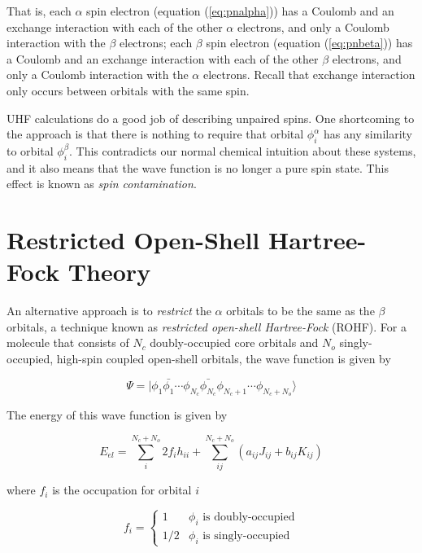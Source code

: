 \noindent That is, each $\alpha$ spin electron (equation
(\ref{eq:pnalpha})) has a Coulomb and an exchange interaction with
each of the other $\alpha$ electrons, and only a Coulomb
interaction with the $\beta$ electrons; each $\beta$ spin electron
(equation (\ref{eq:pnbeta})) has a Coulomb and an exchange interaction
with each of the other $\beta$ electrons, and only a Coulomb
interaction with the $\alpha$ electrons. Recall that exchange
interaction only occurs between orbitals with the same spin.

UHF calculations do a good job of describing unpaired spins. One
shortcoming to the approach is that there is nothing to require that
orbital $\phi_i^\alpha$ has any similarity to orbital
$\phi_i^\beta$. This contradicts our normal chemical intuition about
these systems, and it also means that the wave function is no longer a
pure spin state. This effect is known as \emph{spin contamination}.

\section{Restricted Open-Shell Hartree-Fock Theory}
\label{sec:rohf}
An alternative approach is to \emph{restrict} the $\alpha$ orbitals to
be the same as the $\beta$ orbitals, a technique known as
\emph{restricted open-shell Hartree-Fock} (ROHF). For
a molecule that consists of $N_c$ doubly-occupied core orbitals and
$N_o$ singly-occupied, high-spin coupled open-shell orbitals, the wave
function is given by 

\begin{equation}
  \Psi = |\phi_1\bar{\phi_1}\cdots\phi_{N_c}\bar{\phi_{N_c}}
	\phi_{N_c+1}\cdots\phi_{N_c+N_o}\rangle
\label{eq:wfngen}
\end{equation}

\noindent The energy of this wave function is given by

\begin{equation}
  E_{el} = \sum_i^{N_c+N_o}2f_ih_{ii}+ \sum_{ij}^{N_c+N_o}
	(a_{ij}J_{ij}+b_{ij}K_{ij})
\label{eq:eos}
\end{equation}

\noindent where $f_i$ is the occupation for orbital $i$

\begin{equation}
	f_i = \left\{\begin{array}{ll}
		1 & \mbox{$\phi_i$ is doubly-occupied} \\
		1/2 &  \mbox{$\phi_i$ is singly-occupied}
	\end{array}\right.
\label{eq:fdef}
\end{equation}

